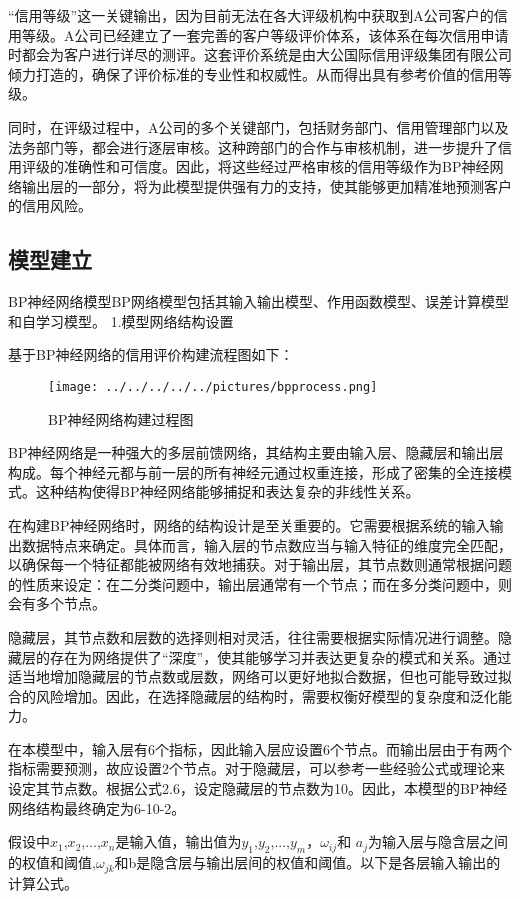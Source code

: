 “信用等级”这一关键输出，因为目前无法在各大评级机构中获取到A公司客户的信用等级。A公司已经建立了一套完善的客户等级评价体系，该体系在每次信用申请时都会为客户进行详尽的测评。这套评价系统是由大公国际信用评级集团有限公司倾力打造的，确保了评价标准的专业性和权威性。从而得出具有参考价值的信用等级。

同时，在评级过程中，A公司的多个关键部门，包括财务部门、信用管理部门以及法务部门等，都会进行逐层审核。这种跨部门的合作与审核机制，进一步提升了信用评级的准确性和可信度。因此，将这些经过严格审核的信用等级作为BP神经网络输出层的一部分，将为此模型提供强有力的支持，使其能够更加精准地预测客户的信用风险。

\subsection{模型建立}
BP神经网络模型BP网络模型包括其输入输出模型、作用函数模型、误差计算模型和自学习模型。
1.模型网络结构设置

基于BP神经网络的信用评价构建流程图如下：

\begin{figure}[!h]
	\centering
	\texttt{[image: ../../../../../pictures/bpprocess.png]}
	\caption{BP神经网络构建过程图}
\end{figure} 

BP神经网络是一种强大的多层前馈网络，其结构主要由输入层、隐藏层和输出层构成。每个神经元都与前一层的所有神经元通过权重连接，形成了密集的全连接模式。这种结构使得BP神经网络能够捕捉和表达复杂的非线性关系。

在构建BP神经网络时，网络的结构设计是至关重要的。它需要根据系统的输入输出数据特点来确定。具体而言，输入层的节点数应当与输入特征的维度完全匹配，以确保每一个特征都能被网络有效地捕获。对于输出层，其节点数则通常根据问题的性质来设定：在二分类问题中，输出层通常有一个节点；而在多分类问题中，则会有多个节点。

隐藏层，其节点数和层数的选择则相对灵活，往往需要根据实际情况进行调整。隐藏层的存在为网络提供了“深度”，使其能够学习并表达更复杂的模式和关系。通过适当地增加隐藏层的节点数或层数，网络可以更好地拟合数据，但也可能导致过拟合的风险增加。因此，在选择隐藏层的结构时，需要权衡好模型的复杂度和泛化能力。

在本模型中，输入层有6个指标，因此输入层应设置6个节点。而输出层由于有两个指标需要预测，故应设置2个节点。对于隐藏层，可以参考一些经验公式或理论来设定其节点数。根据公式2.6，设定隐藏层的节点数为10。因此，本模型的BP神经网络结构最终确定为6-10-2。

假设中$x_1$,$x_2$,...,$x_n$是输入值，输出值为$y_1$,$y_2$,...,$y_m$，$\omega_{ij}$和 $a_j$为输入层与隐含层之间的权值和阈值,$\omega_{jk}$和b是隐含层与输出层间的权值和阈值。以下是各层输入输出的计算公式。

